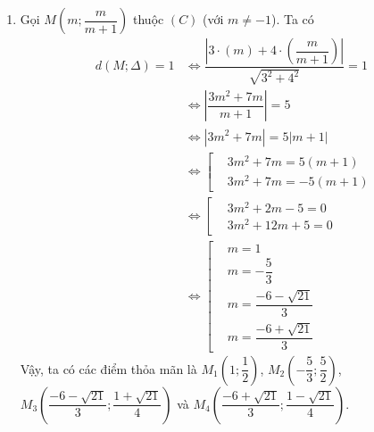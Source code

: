 \begin{bt}
{\begin{enumerate}
\begin{itemize}
\begin{center}
				\end{center}
			\end{itemize}
			\item 
			Gọi $M(m;\dfrac{m}{m+1})$ thuộc $(C)$ (với $m\ne -1$). Ta có
			\begin{align*}
			d(M;\Delta) =1&\Leftrightarrow \dfrac{\left|3\cdot \left(m\right)+4\cdot \left(\dfrac{m}{m+1}\right)\right|}{\sqrt{3^2+4^2}}=1\\ 
			& \Leftrightarrow \left|\dfrac{3m^2+7m}{m+1}\right|=5\\
			&\Leftrightarrow \left|3m^2+7m\right|=5\left|m+1\right|\\
			&\Leftrightarrow \left[\begin{aligned}
			&3m^2+7m=5(m+1)\\ 
			&3m^2+7m=-5(m+1)
			\end{aligned}\right.\\
			&\Leftrightarrow \left[\begin{aligned}
			&3m^2+2m-5=0\\ 
			&3m^2+12m+5=0
			\end{aligned}\right.\\
			&\Leftrightarrow \left[\begin{aligned}
			&m=1\\ 
			&m=-\dfrac{5}{3}\\
			&m=\dfrac{-6-\sqrt{21}}{3}\\
			&m=\dfrac{-6+\sqrt{21}}{3}
			\end{aligned}\right.
			\end{align*}
			Vậy, ta có các điểm thỏa mãn là $ M_1\left(1;\dfrac{1}{2}\right) $, $ M_2\left(-\dfrac{5}{3};\dfrac{5}{2}\right) $, $ M_3\left(\dfrac{-6-\sqrt{21}}{3};\dfrac{1+\sqrt{21}}{4}\right) $ và $ M_4\left(\dfrac{-6+\sqrt{21}}{3};\dfrac{1-\sqrt{21}}{4}\right) $.
		\end{enumerate}
	}
\end{bt}

